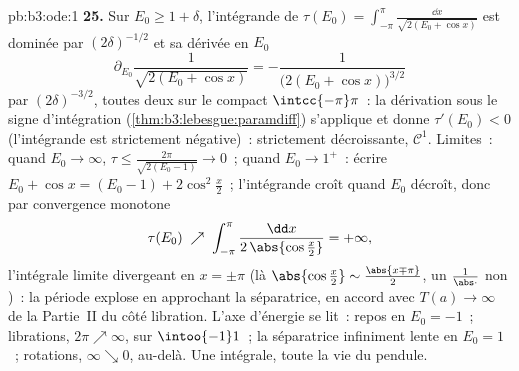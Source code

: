\begin{solution}{pb:b3:ode:1}
\textbf{25.} Sur $E_0 \geq 1 + \delta$, l'intégrande de
$\tau(E_0) = \int_{-\pi}^{\pi}\frac{\dd x}{\sqrt{2(E_0 +
\cos x)}}$ est dominée par $(2\delta)^{-1/2}$ et sa dérivée
en $E_0$
\[
\partial_{E_0}\frac1{\sqrt{2(E_0 + \cos x)}}
= -\frac{1}{\bigl(2(E_0 + \cos x)\bigr)^{3/2}}
\]
par $(2\delta)^{-3/2}$, toutes deux  sur le
compact $\intcc{-\pi}\pi$~: la dérivation sous le signe
d'intégration (\cref{thm:b3:lebesgue:paramdiff}) s'applique
et donne $\tau'(E_0) < 0$ (l'intégrande est strictement
négative)~: strictement décroissante, $\mathcal C^1$.
Limites~: quand $E_0 \to \infty$, $\tau \leq
\frac{2\pi}{\sqrt{2(E_0 - 1)}} \to 0$~; quand $E_0 \to 1^+$~:
écrire $E_0 + \cos x = (E_0 - 1) + 2\cos^2\frac x2$~;
l'intégrande croît quand $E_0$ décroît, donc par
convergence monotone
\[
\tau(E_0) \;\nearrow\;
\int_{-\pi}^{\pi}\frac{\dd x}{2\,\abs{\cos\frac x2}}
= +\infty,
\]
l'intégrale limite divergeant en $x = \pm\pi$ (là
$\abs{\cos\frac x2} \sim \frac{\abs{x \mp \pi}}2$, un
$\frac1{\abs\cdot}$ non )~: la période explose en
approchant la séparatrice, en accord avec $T(a) \to \infty$
de la Partie~II du côté libration. L'axe d'énergie se
lit~: repos en $E_0 = -1$~; librations, $2\pi \nearrow
\infty$, sur $\intoo{-1}1$~; la séparatrice infiniment lente
en $E_0 = 1$~; rotations, $\infty \searrow 0$, au-delà. Une
intégrale, toute la vie du pendule.
\end{solution}
